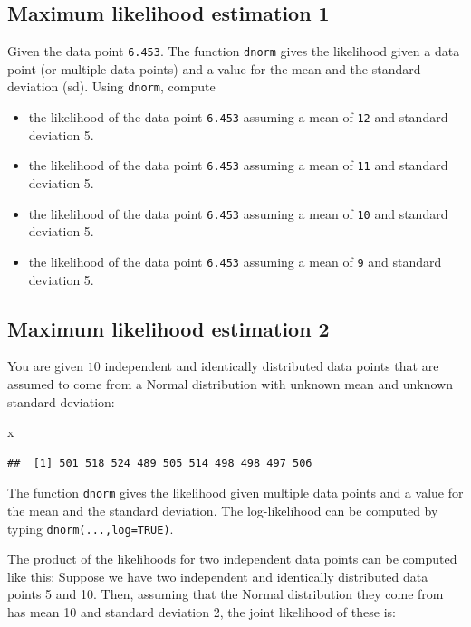 \documentclass[12pt,]{krantz}
\newenvironment{Shaded}{\begin{snugshade}}{\end{snugshade}}
\newcommand{\NormalTok}[1]{#1}
\providecommand{\tightlist}{%
  \setlength{\itemsep}{0pt}\setlength{\parskip}{0pt}}
\theoremstyle{definition}
\theoremstyle{definition}
\theoremstyle{definition}
\theoremstyle{remark}
\begin{document}
\subsection{Maximum likelihood estimation
1}\label{maximum-likelihood-estimation-1}

Given the data point \texttt{6.453}. The function \texttt{dnorm} gives
the likelihood given a data point (or multiple data points) and a value
for the mean and the standard deviation (sd). Using \texttt{dnorm},
compute

\begin{itemize}
\tightlist
\item
  the likelihood of the data point \texttt{6.453} assuming a mean of
  \texttt{12} and standard deviation 5.
\item
  the likelihood of the data point \texttt{6.453} assuming a mean of
  \texttt{11} and standard deviation 5.
\item
  the likelihood of the data point \texttt{6.453} assuming a mean of
  \texttt{10} and standard deviation 5.
\item
  the likelihood of the data point \texttt{6.453} assuming a mean of
  \texttt{9} and standard deviation 5.
\end{itemize}

\subsection{Maximum likelihood estimation
2}\label{maximum-likelihood-estimation-2}

You are given \(10\) independent and identically distributed data points
that are assumed to come from a Normal distribution with unknown mean
and unknown standard deviation:

\begin{Shaded}
\begin{Highlighting}[]
\NormalTok{x}
\end{Highlighting}
\end{Shaded}

\begin{verbatim}
##  [1] 501 518 524 489 505 514 498 498 497 506
\end{verbatim}

The function \texttt{dnorm} gives the likelihood given multiple data
points and a value for the mean and the standard deviation. The
log-likelihood can be computed by typing \texttt{dnorm(...,log=TRUE)}.

The product of the likelihoods for two independent data points can be
computed like this: Suppose we have two independent and identically
distributed data points 5 and 10. Then, assuming that the Normal
distribution they come from has mean 10 and standard deviation 2, the
joint likelihood of these is:
\end{document}
